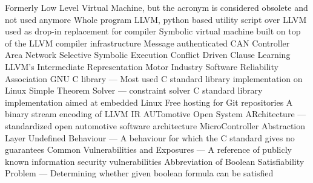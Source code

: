   {Formerly Low Level Virtual Machine, but the acronym is
               considered obsolete and not used anymore}
 {Whole program LLVM, python based utility script over LLVM used
               as drop-in replacement for compiler}
  {Symbolic virtual machine built on top of the LLVM compiler
               infrastructure}
 {Message authenticated CAN}
 {Controller Area Network}
 {Selective Symbolic Execution}
 {Conflict Driven Clause Learning}
 {LLVM's Intermediate Representation}
 {Motor Industry Software Reliability Association}
 {GNU C library --- Most used C standard library implementation on
               Linux}
 {Simple Theorem Solver --- constraint solver}
 {C standard library implementation aimed at embedded Linux}
 {Free hosting for Git repositories}
 {A binary stream encoding of LLVM IR}
 {AUTomotive Open System ARchitecture --- standardized open
                 automotive software architecture}
 {MicroController Abstraction Layer}
 {Undefined Behaviour --- A behaviour for which the C standard gives
            no guarantees}
 {Common Vulnerabilities and Exposures --- A reference of publicly
             known information security vulnerabilities}
 {Abbreviation of Boolean Satisfiability Problem --- Determining
             whether given boolean formula can be satisfied}
